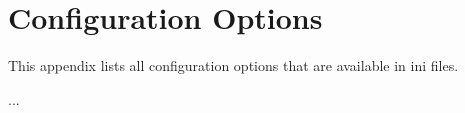 \chapter{Configuration Options}
\label{cha:config-options}

This appendix lists all configuration options that are available in ini files.

...

